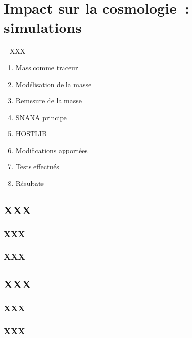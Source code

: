 \documentclass[../main/main.tex]{subfiles}
\begin{document}
\chapter{Impact sur la cosmologie~: simulations}\label{ch:snana}

-- XXX --

\minitoc
\begin{enumerate}
    \item Mass comme traceur
    \item Modélisation de la masse
    \item Remesure de la masse
    \item SNANA principe
    \item HOSTLIB
    \item Modifications apportées
    \item Tests effectués
    \item Résultats
\end{enumerate}
\newpage

\section{XXX}

\subsection{XXX}

\subsection{XXX}


\section{XXX}

\subsection{XXX}

\subsection{XXX}
\end{document}
